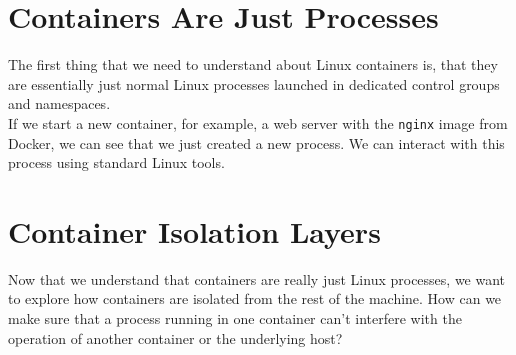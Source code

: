 \documentclass{article}
\begin{document}
\section{Containers Are Just Processes}
The first thing that we need to understand about Linux containers is, 
that they are essentially just normal Linux processes launched in dedicated control groups and namespaces.\\
If we start a new container, for example, a web server with the \texttt{nginx} image from Docker, 
we can see that we just created a new process. We can interact with this process using standard Linux tools.

\section{Container Isolation Layers}
Now that we understand that containers are really just Linux processes, 
we want to explore how containers are isolated from the rest of the machine. 
How can we make sure that a process running in one container can't interfere with the operation of 
another container or the underlying host?
\end{document}
